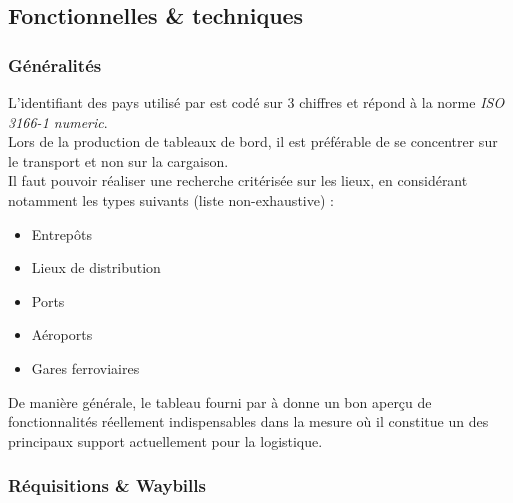 \documentclass[11pt,fleqn]{report}
\begin{document}

\subsection{Fonctionnelles \& techniques}

\subsubsection{Généralités}

L'identifiant des pays utilisé par \mo est codé sur 3 chiffres et répond à la norme \emph{ISO 3166-1 numeric}.\\
Lors de la production de tableaux de bord, il est préférable de se concentrer sur le transport et non sur la cargaison.\\
Il faut pouvoir réaliser une recherche critérisée sur les lieux, en considérant notamment les types suivants (liste non-exhaustive) :
\begin{itemize}
	\item Entrepôts
	\item Lieux de distribution
	\item Ports
	\item Aéroports
	\item Gares ferroviaires
\end{itemize}
De manière générale, le tableau fourni par \mo à \amo donne un bon aperçu de fonctionnalités réellement indispensables dans la mesure où il constitue un des principaux support actuellement pour la logistique.


\subsubsection{Réquisitions \& Waybills}
\end{document}
